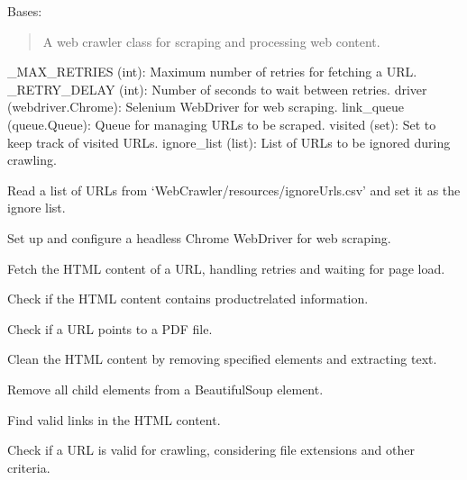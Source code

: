 \documentclass[letterpaper,10pt,english]{sphinxmanual}
\begin{document}
\begin{fulllineitems}
\label{\detokenize{crawler:crawler.WebCrawler}}
\pysigstartsignatures
{}
\pysigstopsignatures
\sphinxAtStartPar
Bases: 
\begin{quote}

\sphinxAtStartPar
A web crawler class for scraping and processing web content.
\end{quote}
\begin{description}
\sphinxAtStartPar
\_MAX\_RETRIES (int): Maximum number of retries for fetching a URL.
\_RETRY\_DELAY (int): Number of seconds to wait between retries.
driver (webdriver.Chrome): Selenium WebDriver for web scraping.
link\_queue (queue.Queue): Queue for managing URLs to be scraped.
visited (set): Set to keep track of visited URLs.
ignore\_list (list): List of URLs to be ignored during crawling.

\begin{description}
\sphinxAtStartPar
Read a list of URLs from ‘WebCrawler/resources/ignoreUrls.csv’ and set it as the ignore list.

\sphinxAtStartPar
Set up and configure a headless Chrome WebDriver for web scraping.

\sphinxAtStartPar
Fetch the HTML content of a URL, handling retries and waiting for page load.

\sphinxAtStartPar
Check if the HTML content contains product\sphinxhyphen{}related information.

\sphinxAtStartPar
Check if a URL points to a PDF file.

\sphinxAtStartPar
Clean the HTML content by removing specified elements and extracting text.

\sphinxAtStartPar
Remove all child elements from a BeautifulSoup element.

\sphinxAtStartPar
Find valid links in the HTML content.

\sphinxAtStartPar
Check if a URL is valid for crawling, considering file extensions and other criteria.


\end{description}
\end{description}
\end{fulllineitems}
\end{document}
